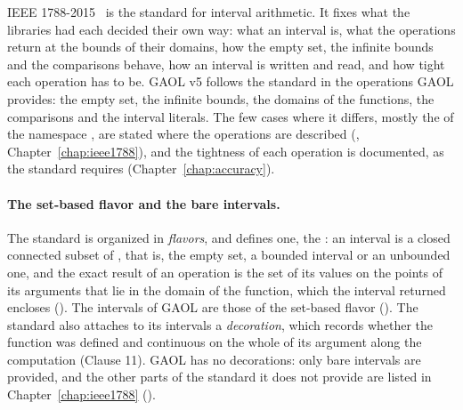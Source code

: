 \documentclass[12pt,a4paper,twoside,openright]{book}
\begin{document}
IEEE 1788-2015~\cite{IEEE1788:2015} is the standard for interval
arithmetic. It fixes what the libraries had each decided their own way:
what an interval is, what the operations return at the bounds of their
domains, how the empty set, the infinite bounds and the comparisons behave,
how an interval is written and read, and how tight each operation has to
be. GAOL v5 follows the standard in the operations GAOL provides: the empty
set, the infinite bounds, the domains of the functions, the comparisons and
the interval literals. The few cases where it differs, mostly the
 of the namespace , are stated where the operations
are described (, Chapter~\ref{chap:ieee1788}),
and the tightness of each operation is documented, as the standard requires
(Chapter~\ref{chap:accuracy}).

\paragraph{The set-based flavor and the bare intervals.} The standard is
organized in \emph{flavors}, and defines one, the :
an interval is a closed connected subset of \RSet, that is, the empty set,
a bounded interval  or an unbounded one, and the exact result of
an operation is the set of its values on the points of its arguments that
lie in the domain of the function, which the interval returned encloses
(). The intervals of GAOL are those of the
set-based flavor (). The standard also attaches to
its intervals a \emph{decoration}, which records whether the function was
defined and continuous on the whole of its argument along the computation
(Clause 11). GAOL has no decorations: only bare intervals are provided, and
the other parts of the standard it does not provide are listed in
Chapter~\ref{chap:ieee1788} ().
%
\end{document}
